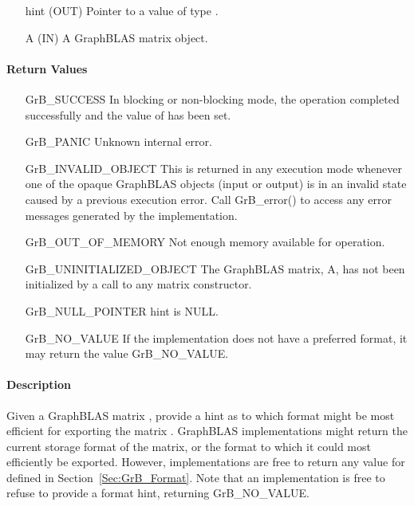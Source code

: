 \begin{itemize}[leftmargin=1.1in]
    \item[{\sf hint}] ({\sf OUT}) Pointer to a value of type .
    \item[{\sf A}]    ({\sf IN}) A GraphBLAS matrix object.
\end{itemize}

\paragraph{Return Values}

\begin{itemize}[leftmargin=2.3in]
    \item[{\sf GrB\_SUCCESS}]   In blocking or non-blocking mode, the operation 
    completed successfully and the value of  has been set.

    \item[{\sf GrB\_PANIC}]           Unknown internal error.
    
    \item[{\sf GrB\_INVALID\_OBJECT}] This is returned in any execution mode 
    whenever one of the opaque GraphBLAS objects (input or output) is in an invalid 
    state caused by a previous execution error.  Call {\sf GrB\_error()} to access 
    any error messages generated by the implementation.

    \item[{\sf GrB\_OUT\_OF\_MEMORY}] Not enough memory available for operation.
    
    \item[{\sf GrB\_UNINITIALIZED\_OBJECT}]  The GraphBLAS matrix, {\sf A}, has 
    not been initialized by a call to any matrix constructor.
    
    \item[{\sf GrB\_NULL\_POINTER}]  {\sf hint} is {\sf NULL}.

    \item[{\sf GrB\_NO\_VALUE}]  If the implementation does not have a preferred
    format, it may return the value {\sf GrB\_NO\_VALUE}.
\end{itemize}

\paragraph{Description}

Given a GraphBLAS matrix , provide a hint as to which format might be most
efficient for exporting the matrix .  GraphBLAS implementations might
return the current storage format of the matrix, or the format to which it could
most efficiently be exported.  However, implementations are free to return any
value for  defined in Section~\ref{Sec:GrB_Format}.  Note that an
implementation is free to refuse to provide a format hint, returning
{\sf GrB\_NO\_VALUE}.

